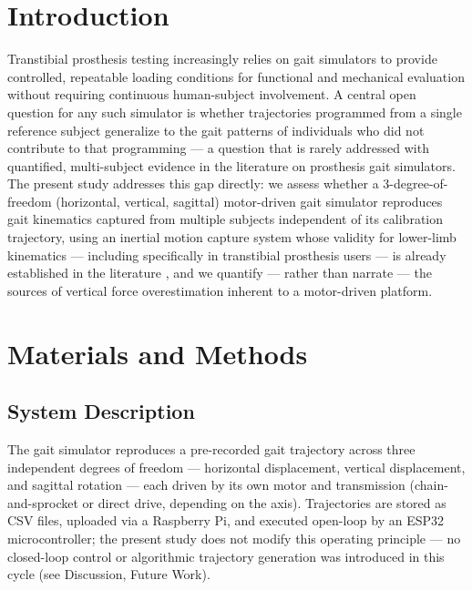 \documentclass[prosthesis,article,submit,moreauthors]{Definitions/mdpi}
\begin{document}
\section{Introduction}

Transtibial prosthesis testing increasingly relies on gait simulators to
provide controlled, repeatable loading conditions for functional and
mechanical evaluation without requiring continuous human-subject
involvement. A central open question for any such simulator is whether
trajectories programmed from a single reference subject generalize to
the gait patterns of individuals who did not contribute to that
programming --- a question that is rarely addressed with quantified,
multi-subject evidence in the literature on prosthesis gait simulators.
The present study addresses this gap directly: we assess whether a
3-degree-of-freedom (horizontal, vertical, sagittal) motor-driven gait
simulator reproduces gait kinematics captured from multiple subjects
independent of its calibration trajectory, using an inertial motion
capture system whose validity for lower-limb kinematics --- including
specifically in transtibial prosthesis users --- is already established
in the literature \cite{PENDIENTE_iSen_transtibial}, and we quantify ---
rather than narrate --- the sources of vertical force overestimation
inherent to a motor-driven platform.

\section{Materials and Methods}

\subsection{System Description}

The gait simulator reproduces a pre-recorded gait trajectory across
three independent degrees of freedom --- horizontal displacement,
vertical displacement, and sagittal rotation --- each driven by its own
motor and transmission (chain-and-sprocket or direct drive, depending on
the axis). Trajectories are stored as CSV files, uploaded via a
Raspberry Pi, and executed open-loop by an ESP32 microcontroller; the
present study does not modify this operating principle --- no
closed-loop control or algorithmic trajectory generation was introduced
in this cycle (see Discussion, Future Work). %
\end{document}
